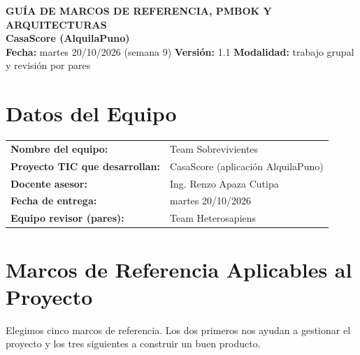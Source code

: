 \documentclass[11pt,a4paper]{article}
\begin{document}
\begin{center}
    {\Large \textbf{\textcolor{AzulUNA}{GUÍA DE MARCOS DE REFERENCIA, PMBOK Y ARQUITECTURAS}}}\\[3pt]
    {\normalsize \textbf{CasaScore (AlquilaPuno)}}\\[4pt]
    \footnotesize \textbf{Fecha:} martes 20/10/2026 (semana 9) \quad \textbar\quad \textbf{Versión:} 1.1 \quad \textbar\quad \textbf{Modalidad:} trabajo grupal y revisión por pares
\end{center}

\vspace{0.1cm}

\section{Datos del Equipo}
\noindent\begin{tabularx}{\textwidth}{@{}P{4.6cm} L@{}}
\toprule
\textbf{Nombre del equipo:} & Team Sobrevivientes \\
\textbf{Proyecto TIC que desarrollan:} & CasaScore (aplicación AlquilaPuno) \\
\textbf{Docente asesor:} & Ing. Renzo Apaza Cutipa \\
\textbf{Fecha de entrega:} & martes 20/10/2026 \\
\textbf{Equipo revisor (pares):} & Team Heterosapiens \\
\bottomrule
\end{tabularx}

\section{Marcos de Referencia Aplicables al Proyecto}
Elegimos cinco marcos de referencia. Los dos primeros nos ayudan a gestionar el proyecto y los tres siguientes a construir un buen producto.
\end{document}
